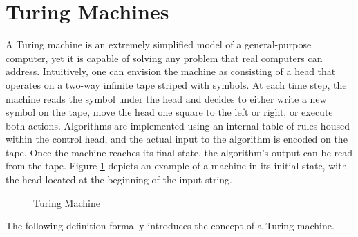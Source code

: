 %
%

\section{Turing Machines}
\label{sec:Turing-Machines}

A Turing machine is an extremely simplified model of a general-purpose computer, yet it is capable of solving any problem that real computers can address. Intuitively, one can envision the machine as consisting of a head that operates on a two-way infinite tape striped with symbols. At each time step, the machine reads the symbol under the head and decides to either write a new symbol on the tape, move the head one square to the left or right, or execute both actions. Algorithms are implemented using an internal table of rules housed within the control head, and the actual input to the algorithm is encoded on the tape. Once the machine reaches its final state, the algorithm's output can be read from the tape. Figure \ref{fig:Turing-Machine} depicts an example of a machine in its initial state, with the head located at the beginning of the input string.

\begin{figure}[t]
\centering
{}
\caption{\label{fig:Turing-Machine}Turing Machine}
\end{figure}

The following definition formally introduces the concept of a Turing machine.

